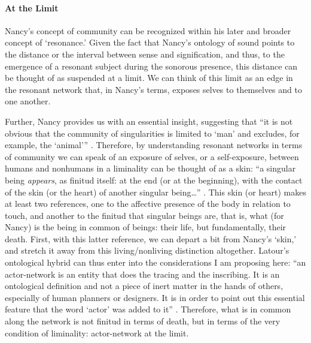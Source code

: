 \paragraph{At the Limit}
Nancy's concept of community can be recognized within his later and broader concept of `resonance.' Given the fact that Nancy's ontology of sound points to the distance or the interval between sense and signification, and thus, to the emergence of a resonant subject during the sonorous presence, this distance can be thought of as suspended at a limit. We can think of this limit as an edge in the resonant network that, in Nancy's terms, exposes selves to themselves and to one another. 


Further, Nancy provides us with an essential insight, suggesting that ``it is not obvious that the community of singularities is limited to `man' and excludes, for example, the `animal''' \parencite[28]{Nan91:The}. Therefore, by understanding resonant networks in terms of community we can speak of an exposure of selves, or a self-exposure, between humans and nonhumans in a liminality can be thought of as a skin: ``a singular being \textit{appears}, as finitud itself: at the end (or at the beginning), with the contact of the skin (or the heart) of another singular being\dots'' \parencite[28]{Nan91:The}. This skin (or heart) makes at least two references, one to the affective presence of the body in relation to touch, and another to the finitud that singular beings are, that is, what (for Nancy) is the being in common of beings: their life, but fundamentally, their death. First, with this latter reference, we can depart a bit from Nancy's `skin,' and stretch it away from this living/nonliving distinction altogether. Latour's ontological hybrid can thus enter into the considerations I am proposing here: ``an actor-network is an entity that does the tracing and the inscribing. It is an ontological definition and not a piece of inert matter in the hands of others, especially of human planners or designers. It is in order to point out this essential feature that the word `actor' was added to it'' \parencite[7]{Lat90:On}. Therefore, what is in common along the network is not finitud in terms of death, but in terms of the very condition of liminality: actor-network at the limit.

